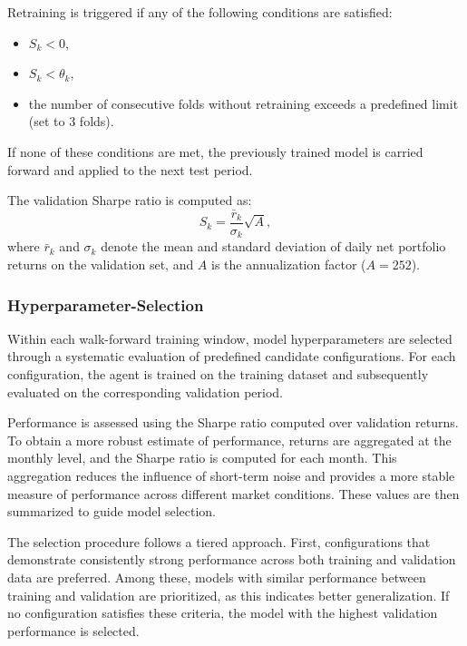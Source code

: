 \documentclass[]{elsarticle}
\begin{document}
Retraining is triggered if any of the following conditions are satisfied:
\begin{itemize}
\item $S_k < 0$,
\item $S_k < \theta_k$,
\item the number of consecutive folds without retraining exceeds a predefined limit (set to 3 folds).
\end{itemize}

If none of these conditions are met, the previously trained model is carried forward and applied to the next test period.

The validation Sharpe ratio is computed as:
\begin{equation}
\label{eq:val_sharpe}
S_k = \frac{\bar{r}_k}{\sigma_k} \sqrt{A},
\end{equation}
where $\bar{r}_k$ and $\sigma_k$ denote the mean and standard deviation of daily net portfolio returns on the validation set, and $A$ is the annualization factor ($A=252$).

\hypertarget{Hyperparameter-Selection}{%
\subsubsection{Hyperparameter-Selection}\label{Hyperparameter-Selection}}

Within each walk-forward training window, model hyperparameters are selected through a systematic evaluation of predefined candidate configurations. For each configuration, the agent is trained on the training dataset and subsequently evaluated on the corresponding validation period.

Performance is assessed using the Sharpe ratio computed over validation returns. To obtain a more robust estimate of performance, returns are aggregated at the monthly level, and the Sharpe ratio is computed for each month. This aggregation reduces the influence of short-term noise and provides a more stable measure of performance across different market conditions. These values are then summarized to guide model selection. 

The selection procedure follows a tiered approach. First, configurations that demonstrate consistently strong performance across both training and validation data are preferred. Among these, models with similar performance between training and validation are prioritized, as this indicates better generalization. If no configuration satisfies these criteria, the model with the highest validation performance is selected.
\end{document}
